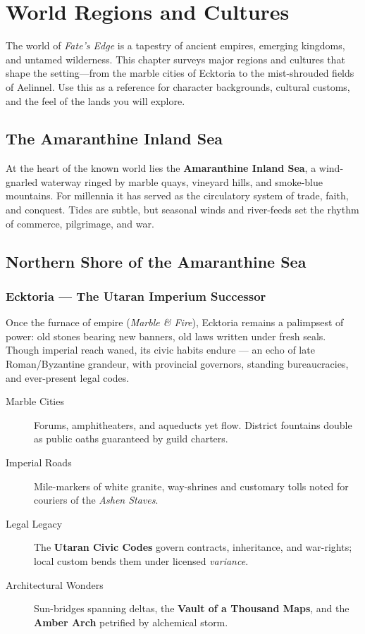 \chapter{World Regions and Cultures}
\label{ch:world-regions}

The world of \textit{Fate's Edge} is a tapestry of ancient empires, emerging kingdoms, and untamed wilderness. This chapter surveys major regions and cultures that shape the setting—from the marble cities of Ecktoria to the mist-shrouded fields of Aelinnel. Use this as a reference for character backgrounds, cultural customs, and the feel of the lands you will explore.

\section{The Amaranthine Inland Sea}
\label{sec:amaranthine-sea}

At the heart of the known world lies the \textbf{Amaranthine Inland Sea}, a wind-gnarled waterway ringed by marble quays, vineyard hills, and smoke-blue mountains. For millennia it has served as the circulatory system of trade, faith, and conquest. Tides are subtle, but seasonal winds and river-feeds set the rhythm of commerce, pilgrimage, and war.

\section{Northern Shore of the Amaranthine Sea}
\label{sec:northern-shore}

\subsection*{Ecktoria — The Utaran Imperium Successor}

Once the furnace of empire (\emph{Marble \& Fire}), Ecktoria remains a palimpsest of power: old stones bearing new banners, old laws written under fresh seals. Though imperial reach waned, its civic habits endure — an echo of late Roman/Byzantine grandeur, with provincial governors, standing bureaucracies, and ever-present legal codes.

\begin{description}
\item[Marble Cities] Forums, amphitheaters, and aqueducts yet flow. District fountains double as public oaths guaranteed by guild charters.
\item[Imperial Roads] Mile-markers of white granite, way-shrines and customary tolls noted for couriers of the \emph{Ashen Staves}.
\item[Legal Legacy] The \textbf{Utaran Civic Codes} govern contracts, inheritance, and war-rights; local custom bends them under licensed \emph{variance}.
\item[Architectural Wonders] Sun-bridges spanning deltas, the \textbf{Vault of a Thousand Maps}, and the \textbf{Amber Arch} petrified by alchemical storm.
\end{description}

